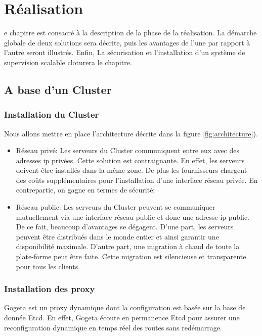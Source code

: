 \chapter{Réalisation}
\begin{onehalfspace}

e chapitre est consacré à la description de la phase de la réalisation. La démarche globale de deux solutions sera décrite, puis les avantages de l'une par rapport à l'autre seront illustrés. Enfin, La sécurisation et l'installation d'un système de supervision scalable cloturera le chapitre.

\newpage

\section{A base d'un Cluster}

\subsection{Installation du Cluster}

Nous allons mettre en place l'architecture décrite dans la figure \ref{fig:architecture}). 


\begin{itemize}
	\item Réseau privé: Les serveurs du Cluster communiquent entre eux avec des adresses \acrshort{ip} privées. Cette solution est contraignante. En effet, les serveurs doivent être installés dans la même zone. De plus les fournisseurs chargent des coûts supplémentaires pour l'installation d'une interface réseau privée. En contrepartie, on gagne en termes de sécurité;
	\item Réseau public: Les serveurs du Cluster peuvent se communiquer mutuellement via une interface réseau public et donc une adresse \acrshort{ip} public. De ce fait, beaucoup d'avantages se dégagent. D'une part, les serveurs peuvent être distribués dans le monde entier et ainsi garantir une disponibilité maximale. D'autre part, une migration à chaud de toute la plate-forme peut être faite. Cette migration est silencieuse et transparente pour tous les clients.
\end{itemize}

\subsection{Installation des proxy}

Gogeta est un proxy dynamique dont la configuration est basée sur la base de donnée Etcd. En effet, Gogeta écoute en permanence Etcd pour assurer une reconfiguration dynamique en temps réel des routes sans redémarrage.


\end{onehalfspace}
